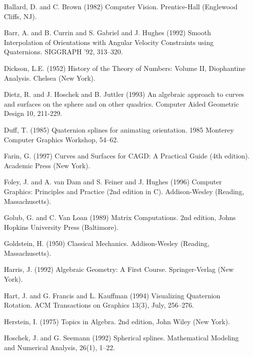 
\begin{thebibliography}{Lozano-Perez 83}

Ballard, D. and C. Brown (1982)
Computer Vision.
Prentice-Hall (Englewood Cliffs, NJ).

Barr, A. and B. Currin and S. Gabriel and J. Hughes (1992)
Smooth Interpolation of Orientations with Angular Velocity Constraints
using Quaternions.
SIGGRAPH '92, 313--320.

Dickson, L.E. (1952) History of the Theory of Numbers: Volume II,
Diophantine Analysis.  Chelsea (New York).

Dietz, R. and J. Hoschek and B. Juttler (1993)
An algebraic approach to curves and surfaces on the sphere and
on other quadrics.
Computer Aided Geometric Design 10, 211-229.

Duff, T. (1985)
Quaternion splines for animating orientation.
1985 Monterey Computer Graphics Workshop, 54--62.

Farin, G. (1997)
Curves and Surfaces for CAGD: A Practical Guide (4th edition).
Academic Press (New York).

Foley, J. and A. van Dam and S. Feiner and J. Hughes (1996)
Computer Graphics: Principles and Practice (2nd edition in C).
Addison-Wesley (Reading, Massachusetts).

Golub, G. and C. Van Loan (1989)
Matrix Computations.
2nd edition, Johns Hopkins University Press (Baltimore).

Goldstein, H. (1950)
Classical Mechanics.
Addison-Wesley (Reading, Massachusetts).

Harris, J. (1992)
Algebraic Geometry: A First Course.
Springer-Verlag (New York).

Hart, J. and G. Francis and L. Kauffman (1994)
Visualizing Quaternion Rotation.
ACM Transactions on Graphics 13(3), July, 256--276.

Herstein, I. (1975) Topics in Algebra.
2nd edition, John Wiley (New York).

Hoschek, J. and G. Seemann (1992)
Spherical splines.
Mathematical Modeling and Numerical Analysis, 26(1), 1--22.


\end{thebibliography}
